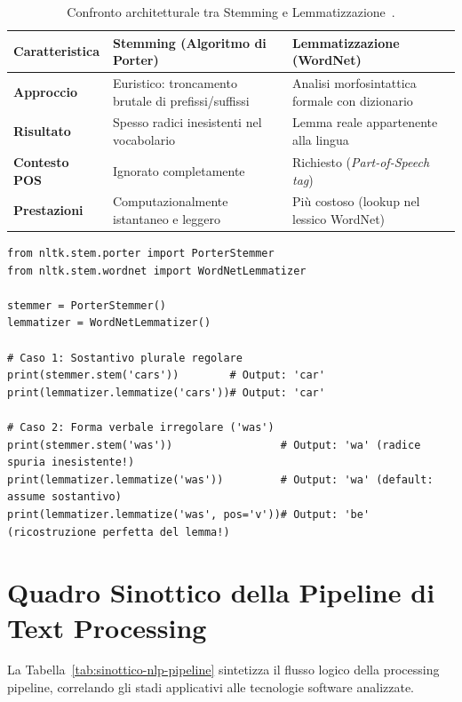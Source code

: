 \begin{table}[H]
\centering
\small
\begin{tabularx}{\linewidth}{l Y Y}
\toprule
\textbf{Caratteristica} & \textbf{Stemming (Algoritmo di Porter)} & \textbf{Lemmatizzazione (WordNet)} \\
\midrule
\textbf{Approccio} & Euristico: troncamento brutale di prefissi/suffissi & Analisi morfosintattica formale con dizionario \\
\textbf{Risultato} & Spesso radici inesistenti nel vocabolario & Lemma reale appartenente alla lingua \\
\textbf{Contesto POS} & Ignorato completamente & Richiesto (\textit{Part-of-Speech tag}) \\
\textbf{Prestazioni} & Computazionalmente istantaneo e leggero & Pi\`u costoso (lookup nel lessico WordNet) \\
\bottomrule
\end{tabularx}
\caption{Confronto architetturale tra Stemming e Lemmatizzazione~\cite{bird2009}.}
\label{tab:stemming-vs-lemmatizzazione}
\end{table}

\begin{lstlisting}[style=pythoncode,caption={Stemming con \texttt{PorterStemmer} contro Lemmatizzazione con \texttt{WordNetLemmatizer}.}]
from nltk.stem.porter import PorterStemmer
from nltk.stem.wordnet import WordNetLemmatizer

stemmer = PorterStemmer()
lemmatizer = WordNetLemmatizer()

# Caso 1: Sostantivo plurale regolare
print(stemmer.stem('cars'))        # Output: 'car'
print(lemmatizer.lemmatize('cars'))# Output: 'car'

# Caso 2: Forma verbale irregolare ('was')
print(stemmer.stem('was'))                 # Output: 'wa' (radice spuria inesistente!)
print(lemmatizer.lemmatize('was'))         # Output: 'wa' (default: assume sostantivo)
print(lemmatizer.lemmatize('was', pos='v'))# Output: 'be' (ricostruzione perfetta del lemma!)
\end{lstlisting}

\FloatBarrier
\section{Quadro Sinottico della Pipeline di Text Processing}
\label{sec:quadro-sinottico-nlp}

La Tabella~\ref{tab:sinottico-nlp-pipeline} sintetizza il flusso logico della processing pipeline, correlando gli stadi applicativi alle tecnologie software analizzate.

